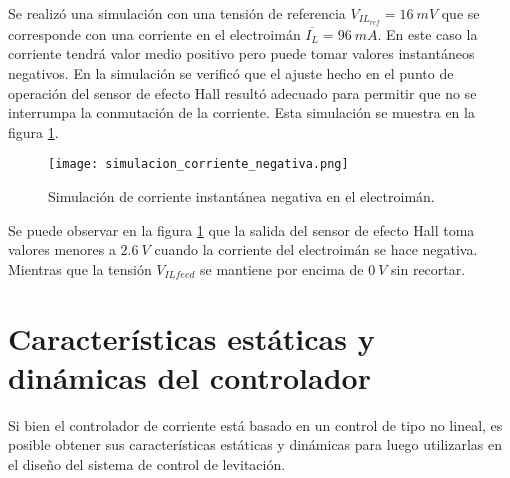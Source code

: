 Se realizó una simulación con una tensión de referencia $V_{IL_{ref}}=16\:mV$ que se corresponde con una corriente en el electroimán $\overline{I_L}=96\:mA$. En este caso la corriente tendrá valor medio positivo pero puede tomar valores instantáneos negativos. En la simulación se verificó que el ajuste hecho en el punto de operación del sensor de efecto Hall resultó adecuado para permitir que no se interrumpa la conmutación de la corriente. Esta simulación se muestra en la figura \ref{fig:simulacion_corriente_negativa}.

\begin{figure}[H]
	\centering
	\texttt{[image: simulacion\_corriente\_negativa.png]}
	\caption{Simulación de corriente instantánea negativa en el electroimán.}
	\label{fig:simulacion_corriente_negativa}
\end{figure}

Se puede observar en la figura \ref{fig:simulacion_corriente_negativa} que la salida del sensor de efecto Hall toma valores menores a $2.6\:V$ cuando la corriente del electroimán se hace negativa. Mientras que la tensión $V_{IL{feed}}$ se mantiene por encima de $0\:V$ sin recortar.

%
%			

\section{Características estáticas y dinámicas del controlador}

Si bien el controlador de corriente está basado en un control de tipo no lineal, es posible obtener sus características estáticas y dinámicas para luego utilizarlas en el diseño del sistema de control de levitación.

